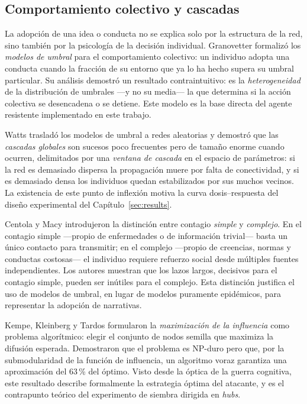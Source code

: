 \documentclass[12pt]{extarticle}
\numberwithin{equation}{section}
\begin{document}
\begin{refsection}
\subsection{Comportamiento colectivo y cascadas}

La adopci\'on de una idea o conducta no se explica solo por la estructura de la red, sino tambi\'en por la psicolog\'ia de la decisi\'on individual. Granovetter \cite{Granovetter1978} formaliz\'o los \emph{modelos de umbral} para el comportamiento colectivo: un individuo adopta una conducta cuando la fracci\'on de su entorno que ya lo ha hecho supera su umbral particular. Su an\'alisis demostr\'o un resultado contraintuitivo: es la \emph{heterogeneidad} de la distribuci\'on de umbrales —y no su media— la que determina si la acci\'on colectiva se desencadena o se detiene. Este modelo es la base directa del agente resistente implementado en este trabajo.

Watts \cite{Watts2002} traslad\'o los modelos de umbral a redes aleatorias y demostr\'o que las \emph{cascadas globales} son sucesos poco frecuentes pero de tama\~no enorme cuando ocurren, delimitados por una \emph{ventana de cascada} en el espacio de par\'ametros: si la red es demasiado dispersa la propagaci\'on muere por falta de conectividad, y si es demasiado densa los individuos quedan estabilizados por sus muchos vecinos. La existencia de este punto de inflexi\'on motiva la curva dosis--respuesta del dise\~no experimental del Cap\'itulo~\ref{sec:results}.

Centola y Macy \cite{CentolaMacy2007} introdujeron la distinci\'on entre contagio \emph{simple} y \emph{complejo}. En el contagio simple —propio de enfermedades o de informaci\'on trivial— basta un \'unico contacto para transmitir; en el complejo —propio de creencias, normas y conductas costosas— el individuo requiere refuerzo social desde m\'ultiples fuentes independientes. Los autores muestran que los lazos largos, decisivos para el contagio simple, pueden ser in\'utiles para el complejo. Esta distinci\'on justifica el uso de modelos de umbral, en lugar de modelos puramente epid\'emicos, para representar la adopci\'on de narrativas.

Kempe, Kleinberg y Tardos \cite{KempeKleinbergTardos2003} formularon la \emph{maximizaci\'on de la influencia} como problema algor\'itmico: elegir el conjunto de nodos semilla que maximiza la difusi\'on esperada. Demostraron que el problema es NP-duro pero que, por la submodularidad de la funci\'on de influencia, un algoritmo voraz garantiza una aproximaci\'on del 63\,\% del \'optimo. Visto desde la \'optica de la guerra cognitiva, este resultado describe formalmente la estrategia \'optima del atacante, y es el contrapunto te\'orico del experimento de siembra dirigida en \emph{hubs}.


\end{refsection}
\end{document}
